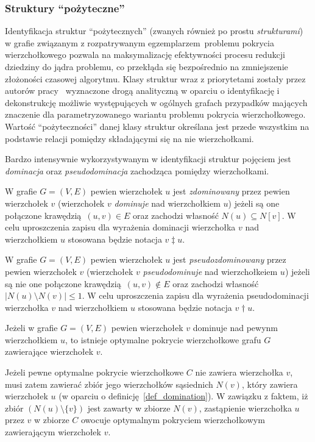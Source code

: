 \subsubsection{\textbf{Struktury ``pożyteczne''}}
\label{sss_ckx_structures}
\par{
  Identyfikacja struktur ``pożytecznych'' (zwanych również po prostu \emph{strukturami}) w grafie związanym z rozpatrywanym egzemplarzem problemu pokrycia wierzchołkowego pozwala na maksymalizację efektywności procesu redukcji dziedziny do jądra problemu, co przekłąda się bezpośrednio na zmniejszenie złożoności czasowej algorytmu. Klasy struktur wraz z priorytetami zostały przez autorów pracy~\cite{ImprovedBounds10} wyznaczone drogą analityczną w oparciu o identyfikację i dekonstrukcję możliwie występujących w ogólnych grafach przypadków mających znaczenie dla parametryzowanego wariantu problemu pokrycia wierzchołkowego.
  Wartość ``pożyteczności'' danej klasy struktur określana jest przede wszystkim na podstawie relacji pomiędzy składającymi się na nie wierzchołkami.
}
\par{
  Bardzo intensywnie wykorzystywanym w identyfikacji struktur pojęciem jest \emph{dominacja} oraz \emph{pseudodominacja} zachodząca pomiędzy wierzchołkami.
  \begin{definition}
    W grafie $G=(V, E)$ pewien wierzchołek $u$ jest \emph{zdominowany} przez pewien wierzchołek $v$ (wierzchołek $v$ \emph{dominuje} nad wierzchołkiem $u$) jeżeli są one połączone krawędzią $(u, v) \in E$ oraz zachodzi własność $N(u) \subseteq N[v]$.
    W celu uproszczenia zapisu dla wyrażenia dominacji wierzchołka $v$ nad wierzchołkiem $u$ stosowana będzie notacja $v \ddagger u$.
  \end{definition}
  \begin{definition}
    W grafie $G=(V, E)$ pewien wierzchołek $u$ jest \emph{pseudozdominowany} przez pewien wierzchołek $v$ (wierzchołek $v$ \emph{pseudodominuje} nad wierzchołkeiem $u$) jeżeli są nie one połączone krawędzią $(u, v) \notin E$ oraz zachodzi własność $|N(u) \setminus N(v)| \leq 1$.
    W celu uproszczenia zapisu dla wyrażenia pseudodominacji wierzchołka $v$ nad wierzchołkiem $u$ stosowana będzie notacja $v \dagger u$.
  \end{definition}
  \begin{theorem}
      Jeżeli w grafie $G=(V, E)$ pewien wierzchołek $v$ dominuje nad pewynm wierzchołkiem $u$, to istnieje optymalne pokrycie wierzchołkowe grafu $G$ zawierające wierzchołek $v$.
  \end{theorem}
  \begin{bproof}
    Jeżeli pewne optymalne pokrycie wierzchołkowe $C$ nie zawiera wierzchołka $v$, musi zatem zawierać zbiór jego wierzchołków sąsiednich $N(v)$, który zawiera wierzchołek $u$ (w oparciu o definicję~\ref{def_domination}).
    W zawiązku z faktem, iż zbiór $(N(u) \setminus \{v\})$ jest zawarty w zbiorze $N(v)$, zastąpienie wierzchołka $u$ przez $v$ w zbiorze $C$ owocuje optymalnym pokryciem wierzchołkowym zawierającym wierzchołek $v$.
  \end{bproof}
}
